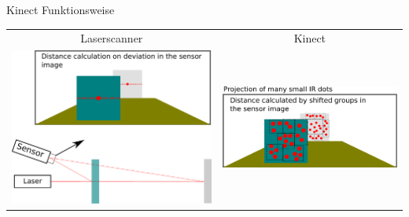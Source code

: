 \documentclass{VLKlauck}
\begin{document}
	\begin{frame}{Kinect Funktionsweise} 
		
		\begin{tabular}{SS}
			Laserscanner							   & Kinect\\
			\includegraphics[scale=0.18]{laserScannerPrinciple.pdf}  & \includegraphics[scale=0.18]{kinect_principle.pdf}\\	
		\end{tabular} 
	\end{frame}
	
\end{document}
